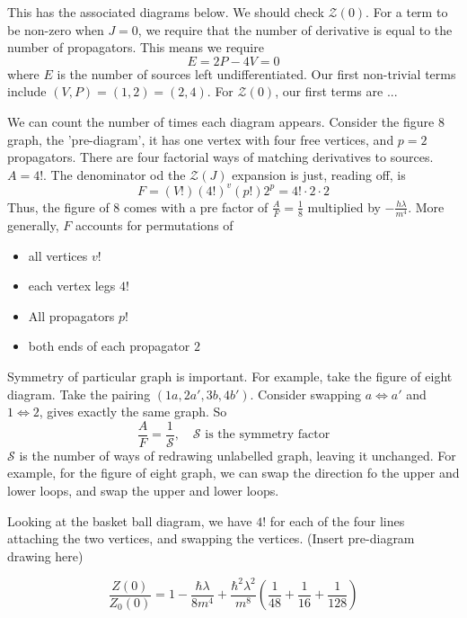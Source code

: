 \documentclass[11pt, oneside]{article}   	%
\theoremstyle{slanted}
\begin{document}
This has the associated diagrams below. 
We should check $ \mathcal{ Z } \left( 0  \right)  $. 
For a term to be non-zero when $ J = 0 $, 
we require that the number of derivative is equal to 
the number of propagators. 
This means we require 
\[
E = 2P - 4 V  =0 
\]  where $ E $ is the number of sources 
left undifferentiated. 
Our first non-trivial terms include 
$ \left( V , P  \right)   = \left( 1, 2  \right)   = \left( 2, 4  \right)  $. 
For $ \mathcal{ Z } \left( 0  \right)  $, our first terms 
are ... 

We can count the number of times each diagram appears. 
Consider the figure 8 graph, the 'pre-diagram', 
it has one vertex with four free vertices, 
and $ p = 2 $ propagators. 
There are four factorial ways of matching 
derivatives to sources. $ A  = 4 ! $. 
The denominator od the $ \mathcal{ Z } \left( J  \right)  $ 
expansion is just, reading off, 
is 
\[
F = \left( V !  \right)  \left( 4 !  \right)  ^{ v } \left( p !  \right)  
2 ^ p  = 4  ! \cdot  2 \cdot  2 
\] Thus, the figure of $ 8 $ comes 
with a pre factor of $ \frac{A}{F }  = \frac{1}{8 } $ multiplied 
by $ - \frac{h \lambda }{ m ^  4 }  $. 
More generally, $ F $ accounts for permutations of 
\begin{itemize}
\item all vertices $ v ! $ 
\item each vertex legs $ 4 ! $ 
\item All propagators $ p ! $ 
\item both ends of each propagator $ 2 $ 
\end{itemize}
Symmetry of particular graph is 
important. 
For example, take the figure of eight diagram. 
Take the pairing  $ \left( 1a, 2a', 3b, 4b'  \right)  $.
Consider swapping $ a \iff a'  $  and $ 1 \iff 2  $, 
gives exactly the same graph. 
So 
\[
\frac{A}{F }   = \frac{1}{\mathcal{ S } }, \quad \mathcal{ S } \text{ is the symmetry factor}
\] $ \mathcal{ S } $ is the number of 
ways of redrawing unlabelled graph, 
leaving it unchanged. 
For example, 
for the figure of eight graph, we can 
swap the direction fo the upper and lower loops, 
and swap the upper and lower loops. 

Looking at the basket ball diagram, 
we have $ 4 ! $ for each of the four lines attaching the two vertices, 
and swapping the vertices. 
(Insert pre-diagram drawing here)

\[
\frac{ Z( 0 ) }{ Z _ 0 \left( 0  \right)  } 
 = 1 - \frac{ \hbar \lambda }{ 8 m ^ 4 } + \frac{ \hbar ^ 2 \lambda ^ 2 }{ m ^ 8 } 
 \left( \frac{1}{48 } + \frac{1}{16 } + \frac{1}{128 } \right) 
\]
\end{document}
